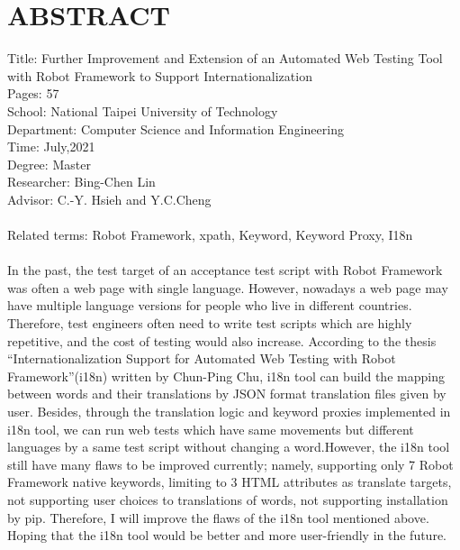 \chapter*{ABSTRACT}


\noindent
Title: Further Improvement and Extension of an Automated Web Testing Tool 
with Robot Framework to Support Internationalization\\
Pages: 57\\
School: National Taipei University of Technology\\
Department: Computer Science and Information Engineering\\
Time: July,2021\\
Degree: Master\\
Researcher: Bing-Chen Lin\\
Advisor: C.-Y. Hsieh and Y.C.Cheng\\
\hspace*{\fill}\\
Related terms: Robot Framework, xpath, Keyword, Keyword Proxy, I18n\\
\hspace*{\fill}\\
%
\indent
In the past, the test target of an acceptance test script with Robot Framework was often a  web page with single language. However, nowadays a web page may have multiple language versions for people who live in different countries. Therefore, test engineers often need to write test scripts which are highly repetitive, and the cost of testing would also increase. According to the thesis “Internationalization Support for Automated Web Testing with Robot Framework”(i18n) written by Chun-Ping Chu, i18n tool can build the mapping between words and their translations by JSON format translation files given by user. Besides, through the translation logic and keyword proxies implemented in i18n tool, we can run web tests which have same movements but different languages by a same test script without changing a word.However, the i18n tool still have many flaws to be improved currently; namely, supporting only 7 Robot Framework native keywords, limiting to 3 HTML attributes as translate targets, not supporting user choices to translations of words, not supporting installation by pip. Therefore, I will improve the flaws of the i18n tool mentioned above. Hoping that the i18n tool would be better and more user-friendly in the future.
